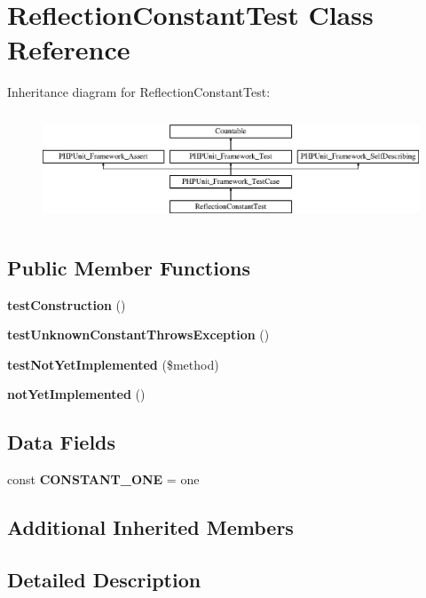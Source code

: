 \section{Reflection\+Constant\+Test Class Reference}
\label{class_psy_1_1_test_1_1_reflection_1_1_reflection_constant_test}
Inheritance diagram for Reflection\+Constant\+Test\+:\begin{figure}[H]
\begin{center}
\leavevmode
\includegraphics[height=3.303835cm]{class_psy_1_1_test_1_1_reflection_1_1_reflection_constant_test}
\end{center}
\end{figure}
\subsection*{Public Member Functions}
\begin{DoxyCompactItemize}
\item 
{\bf test\+Construction} ()
\item 
{\bf test\+Unknown\+Constant\+Throws\+Exception} ()
\item 
{\bf test\+Not\+Yet\+Implemented} (\$method)
\item 
{\bf not\+Yet\+Implemented} ()
\end{DoxyCompactItemize}
\subsection*{Data Fields}
\begin{DoxyCompactItemize}
\item 
const {\bf C\+O\+N\+S\+T\+A\+N\+T\+\_\+\+O\+N\+E} = \textquotesingle{}one\textquotesingle{}
\end{DoxyCompactItemize}
\subsection*{Additional Inherited Members}


\subsection{Detailed Description}


